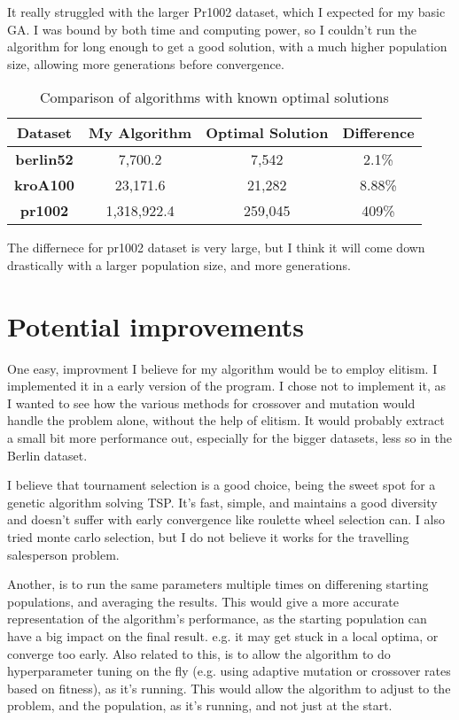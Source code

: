 \documentclass[11pt]{scrartcl} %
\begin{document}
It really struggled with the larger Pr1002 dataset, which I expected for my basic GA. 
I was bound by both time and computing power, so I couldn't run the algorithm for long enough to get a good solution, with a much higher population size, allowing more generations before convergence.

\begin{table}[h!]
\centering
\begin{tabular}{|c|c|c|c|}
\hline
\textbf{Dataset} & \textbf{My Algorithm} & \textbf{Optimal Solution} & \textbf{Difference} \\ \hline
\textbf{berlin52} & 7,700.2 & 7,542 & 2.1\% \\ \hline
\textbf{kroA100} & 23,171.6 & 21,282 & 8.88\% \\ \hline
\textbf{pr1002} & 1,318,922.4 & 259,045 & 409\% \\ \hline
\end{tabular}
\caption{Comparison of algorithms with known optimal solutions}
\label{tab:comparison}
\end{table}

The differnece for pr1002 dataset is very large, but I think it will come down drastically with a larger population size, and more generations.

\section{Potential improvements}
\label{Potential improvements}
One easy, improvment I believe for my algorithm would be to employ elitism.
I implemented it in a early version of the program. I chose not to implement it, as I wanted to see how the various methods for crossover and mutation would handle the problem alone, without the help of elitism.
It would probably extract a small bit more performance out, especially for the bigger datasets, less so in the Berlin dataset.

I believe that tournament selection is a good choice, being the sweet spot for a genetic algorithm solving TSP. It's fast, simple, and maintains a good diversity and doesn't suffer with early convergence like roulette wheel selection can\cite{genetic_algorithm_afternoon}.
I also tried monte carlo selection, but I do not believe it works for the travelling salesperson problem.

Another, is to run the same parameters multiple times on differening starting populations, and averaging the results. This would give a more accurate representation of the algorithm's performance, as the starting population can have a big impact on the final result. e.g. it may get stuck in a local optima, or converge too early.
Also related to this, is to allow the algorithm to do hyperparameter tuning on the fly (e.g. using adaptive mutation or crossover rates based on fitness), as it's running. This would allow the algorithm to adjust to the problem, and the population, as it's running, and not just at the start.
\end{document}
